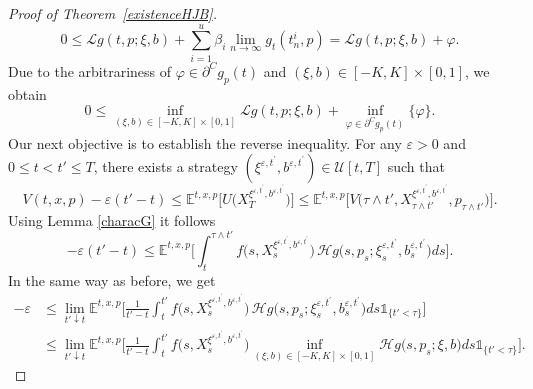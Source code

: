 \documentclass[reqno, 11pt]{amsart}%
\newcommand{\Eop}{\mathbb{E}}
\newcommand{\indicator}{{\mathds 1}}
\newcommand{\Ind}[1]{\indicator_{\{#1\}}}
\theoremstyle{definition}
\numberwithin{equation}{section} \numberwithin{theorem}{section}
\begin{document}
\begin{proof}[Proof of Theorem~\ref{existenceHJB}]
\begin{equation*}
   0 \le \mathcal{L}g(t,p;\xi,b)+\sum_{i=1}^u\beta_i\lim_{n\to\infty}g_t(t_n^i,p)
   = \mathcal{L}g(t,p;\xi,b)+ \varphi.
   \end{equation*}
   Due to the arbitrariness of $\varphi\in\partial^C g_p(t)$ and $(\xi,b)\in[-K,K]\times[0,1]$, we obtain 
   \begin{equation*}
   0 \le \inf_{(\xi,b)\in[-K,K]\times[0,1]}\mathcal{L}g(t,p;\xi,b)+ \inf_{\varphi\in\partial^C g_p(t)}\{\varphi\}.
   \end{equation*}
   Our next objective is to establish the reverse inequality. For any $\varepsilon>0$ and $0\le t<t'\le T$, there exists a strategy $({\xi^{\varepsilon,t^\prime},b^{\varepsilon,t^\prime}})\in \mathcal{U}[t,T]$ such that
   \begin{equation*}
   V(t,x,p)-\varepsilon(t'-t)\le \Eop^{t,x,p}\Big[U\big(X_T^{\xi^{\varepsilon,t^\prime},b^{\varepsilon,t^\prime}}\big)\Big] 
   \le \Eop^{t,x,p}\Big[V\big(\tau\wedge t',X^{\xi^{\varepsilon,t^\prime},b^{\varepsilon,t^\prime}}_{\tau\wedge t'},p_{\tau\wedge t'}\big)\Big].
   \end{equation*}
   Using Lemma \ref{characG} it follows
   \begin{equation*}
   -\varepsilon(t'-t)\le \Eop^{t,x,p}\bigg[\int_t^{\tau\wedge t'} f\big(s,X^{\xi^{\varepsilon,t^\prime},b^{\varepsilon,t^\prime}}_s\big)\,\mathcal{H}g\big(s,p_s;\xi^{\varepsilon,t^\prime}_s,b^{\varepsilon,t^\prime}_s\big)ds\bigg].
   \end{equation*}
   In the same way as before, we get 
   \begin{align*} 
   -\varepsilon&\le \lim_{t'\downarrow t}\Eop^{t,x,p}\bigg[\frac{1}{t'-t}\int_t^{t'} f\big(s,X^{\xi^{\varepsilon,t^\prime},b^{\varepsilon,t^\prime}}_s\big)\,\mathcal{H}g\big(s,p_s;\xi^{\varepsilon,t^\prime}_s,b^{\varepsilon,t^\prime}_s\big)ds\Ind{t'<\tau}\bigg] \\
   &\le\lim_{t'\downarrow t}\Eop^{t,x,p}\bigg[\frac{1}{t'-t}\int_t^{t'}\! f\big(s,X^{\xi^{\varepsilon,t^\prime},b^{\varepsilon,t^\prime}}_s\big)\!\inf_{(\xi,b)\in[-K,K]\times[0,1]}\mathcal{H}g\big(s,p_s;\xi,b\big)ds\Ind{t'<\tau}\bigg].
   \end{align*}

\end{proof}
\end{document}
